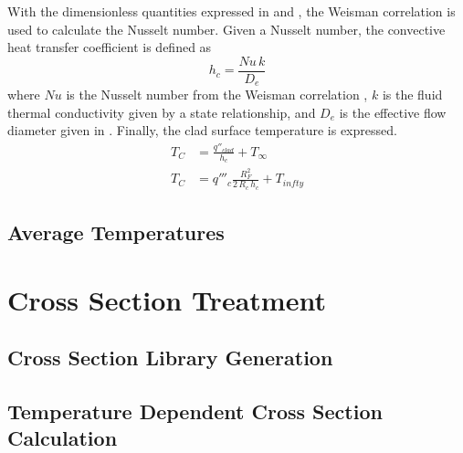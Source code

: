       With the dimensionless quantities expressed in  and
      , the Weisman correlation is used to calculate the Nusselt
      number. Given a Nusselt number, the convective heat transfer coefficient
      is defined as
      \begin{equation}
        \label{eq:hc}
        h_c = \frac{Nu \, k}{D_e}
      \end{equation}
      where $Nu$ is the Nusselt number from the Weisman correlation
      , $k$ is the fluid thermal conductivity given by a state
      relationship, and $D_e$ is the effective flow diameter given in
      . Finally, the clad surface temperature is expressed.
      \begin{align}
        T_C &= \frac{q''_{clad}}{h_c} + T_{\infty} \\
        \label{eq:tc}
        T_C &= q'''_c \frac{R_F^2}{2\,R_c\,h_c} + T_{infty}
      \end{align}

  \subsection{Average Temperatures}
\section{Cross Section Treatment}
  \subsection{Cross Section Library Generation}
  \subsection{Temperature Dependent Cross Section Calculation}

